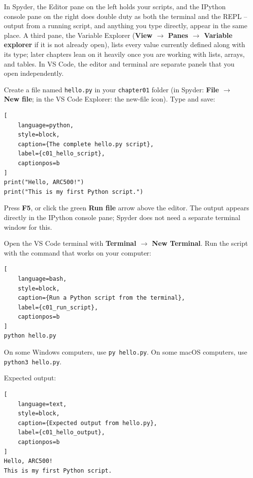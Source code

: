 In Spyder, the Editor pane on the left holds your scripts, and the IPython
console pane on the right does double duty as both the terminal and the
REPL -- output from a running script, and anything you type directly, appear
in the same place. A third pane, the Variable Explorer
(\textbf{View $\rightarrow$ Panes $\rightarrow$ Variable explorer} if it is
not already open), lists every value currently defined along with its type;
later chapters lean on it heavily once you are working with lists, arrays,
and tables. In VS Code, the editor and terminal are separate panels that you
open independently.


Create a file named \texttt{hello.py} in your \texttt{chapter01} folder (in
Spyder: \textbf{File $\rightarrow$ New file}; in the VS Code Explorer: the
new-file icon). Type and save:

\begin{lstlisting}[
    language=python,
    style=block,
    caption={The complete hello.py script},
    label={c01_hello_script},
    captionpos=b
]
print("Hello, ARC500!")
print("This is my first Python script.")
\end{lstlisting}


Press \textbf{F5}, or click the green \textbf{Run file} arrow above the
editor. The output appears directly in the IPython console pane; Spyder does
not need a separate terminal window for this.


Open the VS Code terminal with \textbf{Terminal $\rightarrow$ New Terminal}.
Run the script with the command that works on your computer:

\begin{lstlisting}[
    language=bash,
    style=block,
    caption={Run a Python script from the terminal},
    label={c01_run_script},
    captionpos=b
]
python hello.py
\end{lstlisting}

On some Windows computers, use \texttt{py hello.py}. On some macOS computers,
use \texttt{python3 hello.py}.

Expected output:

\begin{lstlisting}[
    language=text,
    style=block,
    caption={Expected output from hello.py},
    label={c01_hello_output},
    captionpos=b
]
Hello, ARC500!
This is my first Python script.
\end{lstlisting}

